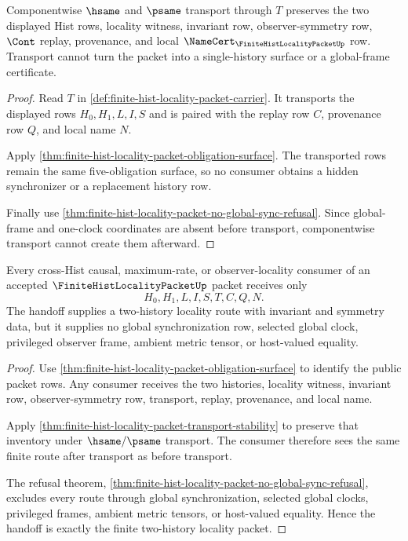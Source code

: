 \begin{theorem}
\label{thm:finite-hist-locality-packet-transport-stability}
Componentwise $\hsame$ and $\psame$ transport through $T$ preserves the two displayed Hist rows, locality witness, invariant row, observer-symmetry row, $\Cont$ replay, provenance, and local $\NameCert_{\FiniteHistLocalityPacketUp}$ row. Transport cannot turn the packet into a single-history surface or a global-frame certificate.
\end{theorem}
\begin{proof}
Read $T$ in \autoref{def:finite-hist-locality-packet-carrier}. It transports the displayed rows $H_0,H_1,L,I,S$ and is paired with the replay row $C$, provenance row $Q$, and local name $N$.

Apply \autoref{thm:finite-hist-locality-packet-obligation-surface}. The transported rows remain the same five-obligation surface, so no consumer obtains a hidden synchronizer or a replacement history row.

Finally use \autoref{thm:finite-hist-locality-packet-no-global-sync-refusal}. Since global-frame and one-clock coordinates are absent before transport, componentwise transport cannot create them afterward.
\end{proof}

\begin{theorem}
\label{thm:finite-hist-locality-packet-consumer-handoff}
Every cross-Hist causal, maximum-rate, or observer-locality consumer of an accepted $\FiniteHistLocalityPacketUp$ packet receives only
$$
H_0,H_1,L,I,S,T,C,Q,N .
$$
The handoff supplies a two-history locality route with invariant and symmetry data, but it supplies no global synchronization row, selected global clock, privileged observer frame, ambient metric tensor, or host-valued equality.
\end{theorem}
\begin{proof}
Use \autoref{thm:finite-hist-locality-packet-obligation-surface} to identify the public packet rows. Any consumer receives the two histories, locality witness, invariant row, observer-symmetry row, transport, replay, provenance, and local name.

Apply \autoref{thm:finite-hist-locality-packet-transport-stability} to preserve that inventory under $\hsame/\psame$ transport. The consumer therefore sees the same finite route after transport as before transport.

The refusal theorem, \autoref{thm:finite-hist-locality-packet-no-global-sync-refusal}, excludes every route through global synchronization, selected global clocks, privileged frames, ambient metric tensors, or host-valued equality. Hence the handoff is exactly the finite two-history locality packet.
\end{proof}


